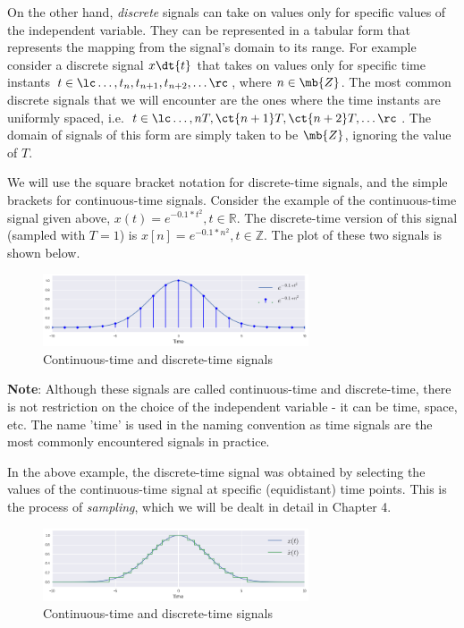 On the other hand, \textit{discrete} signals can take on values only for specific values of the independent variable. They can be represented in a tabular form that represents the mapping from the signal's domain to its range. For example consider a discrete signal $x\dt{t}$ that takes on values only for specific time instants $t \in \lc \ldots, t_{n}, t_{n+1}, t_{n+2}, \ldots \rc$, where $n \in \mb{Z}$. The most common discrete signals that we will encounter are the ones where the time instants are uniformly spaced, i.e. $t \in \lc \ldots, nT, \ct{n+1}T, \ct{n+2}T, \ldots \rc$. The domain of signals of this form are simply taken to be $\mb{Z}$, ignoring the value of $T$.

We will use the square bracket notation for discrete-time signals, and the simple brackets for continuous-time signals. Consider the example of the continuous-time signal given above, $x\left(t\right) = e^{-0.1*t^{2}}, t \in \mathbb{R}$. The discrete-time version of this signal (sampled with $T = 1$) is $x\left[n\right] = e^{-0.1*n^{2}}, t \in \mathbb{Z}$. The plot of these two signals is shown below.

\begin{figure}[h!]
\centering
    \includegraphics[width=0.7\textwidth]{figs/stem-plot.png}
\caption{Continuous-time and discrete-time signals} \label{fig:ch1_stem}
\end{figure}

\vspace{0.2cm}
{\small \color{black!70!} \noindent\textbf{Note}: Although these signals are called continuous-time and discrete-time, there is not restriction on the choice of the independent variable - it can be time, space, etc. The name 'time' is used in the naming convention as time signals are the most commonly encountered signals in practice.}

In the above example, the discrete-time signal was obtained by selecting the values of the continuous-time signal at specific (equidistant) time points. This is the process of \textit{sampling}, which we will be dealt in detail in Chapter 4.

\begin{figure}[h!]
\centering
    \includegraphics[width=0.7\textwidth]{figs/quantization-plot.png}
\caption{Continuous-time and discrete-time signals} \label{fig:ch1_quant}
\end{figure}

